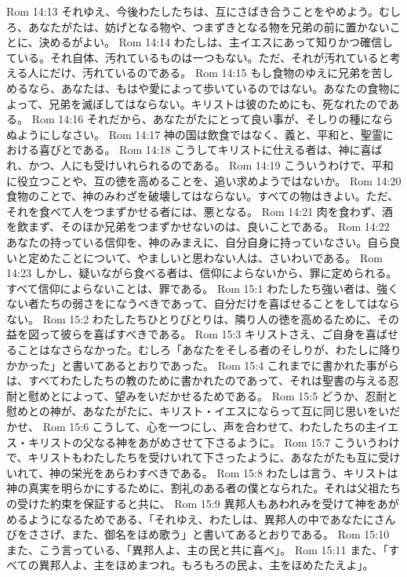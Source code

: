 Rom 14:13  それゆえ、今後わたしたちは、互にさばき合うことをやめよう。むしろ、あなたがたは、妨げとなる物や、つまずきとなる物を兄弟の前に置かないことに、決めるがよい。
Rom 14:14  わたしは、主イエスにあって知りかつ確信している。それ自体、汚れているものは一つもない。ただ、それが汚れていると考える人にだけ、汚れているのである。
Rom 14:15  もし食物のゆえに兄弟を苦しめるなら、あなたは、もはや愛によって歩いているのではない。あなたの食物によって、兄弟を滅ぼしてはならない。キリストは彼のためにも、死なれたのである。
Rom 14:16  それだから、あなたがたにとって良い事が、そしりの種にならぬようにしなさい。
Rom 14:17  神の国は飲食ではなく、義と、平和と、聖霊における喜びとである。
Rom 14:18  こうしてキリストに仕える者は、神に喜ばれ、かつ、人にも受けいれられるのである。
Rom 14:19  こういうわけで、平和に役立つことや、互の徳を高めることを、追い求めようではないか。
Rom 14:20  食物のことで、神のみわざを破壊してはならない。すべての物はきよい。ただ、それを食べて人をつまずかせる者には、悪となる。
Rom 14:21  肉を食わず、酒を飲まず、そのほか兄弟をつまずかせないのは、良いことである。
Rom 14:22  あなたの持っている信仰を、神のみまえに、自分自身に持っていなさい。自ら良いと定めたことについて、やましいと思わない人は、さいわいである。
Rom 14:23  しかし、疑いながら食べる者は、信仰によらないから、罪に定められる。すべて信仰によらないことは、罪である。
Rom 15:1  わたしたち強い者は、強くない者たちの弱さをになうべきであって、自分だけを喜ばせることをしてはならない。
Rom 15:2  わたしたちひとりびとりは、隣り人の徳を高めるために、その益を図って彼らを喜ばすべきである。
Rom 15:3  キリストさえ、ご自身を喜ばせることはなさらなかった。むしろ「あなたをそしる者のそしりが、わたしに降りかかった」と書いてあるとおりであった。
Rom 15:4  これまでに書かれた事がらは、すべてわたしたちの教のために書かれたのであって、それは聖書の与える忍耐と慰めとによって、望みをいだかせるためである。
Rom 15:5  どうか、忍耐と慰めとの神が、あなたがたに、キリスト・イエスにならって互に同じ思いをいだかせ、
Rom 15:6  こうして、心を一つにし、声を合わせて、わたしたちの主イエス・キリストの父なる神をあがめさせて下さるように。
Rom 15:7  こういうわけで、キリストもわたしたちを受けいれて下さったように、あなたがたも互に受けいれて、神の栄光をあらわすべきである。
Rom 15:8  わたしは言う、キリストは神の真実を明らかにするために、割礼のある者の僕となられた。それは父祖たちの受けた約束を保証すると共に、
Rom 15:9  異邦人もあわれみを受けて神をあがめるようになるためである、「それゆえ、わたしは、異邦人の中であなたにさんびをささげ、また、御名をほめ歌う」と書いてあるとおりである。
Rom 15:10  また、こう言っている、「異邦人よ、主の民と共に喜べ」。
Rom 15:11  また、「すべての異邦人よ、主をほめまつれ。もろもろの民よ、主をほめたたえよ」。
